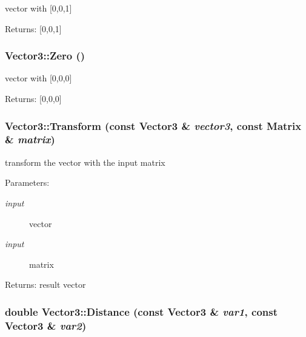 vector with \mbox{[}0,0,1\mbox{]} \begin{Desc}
\item[Returns:]\mbox{[}0,0,1\mbox{]} \end{Desc}
\hypertarget{class_vector3_596774f76ffa9334516e14065daa8902}{
\subsubsection[Zero]{ Vector3::Zero ()}}
\label{class_vector3_596774f76ffa9334516e14065daa8902}


vector with \mbox{[}0,0,0\mbox{]} \begin{Desc}
\item[Returns:]\mbox{[}0,0,0\mbox{]} \end{Desc}
\hypertarget{class_vector3_fd31dba5d2ea99d6da03b2fd220847f5}{
\subsubsection[Transform]{ Vector3::Transform (const {\bf Vector3} \& {\em vector3}, \/  const {\bf Matrix} \& {\em matrix})}}
\label{class_vector3_fd31dba5d2ea99d6da03b2fd220847f5}


transform the vector with the input matrix \begin{Desc}
\item[Parameters:]
\begin{description}
\item[{\em input}]vector \item[{\em input}]matrix \end{description}
\end{Desc}
\begin{Desc}
\item[Returns:]result vector \end{Desc}
\hypertarget{class_vector3_b1248a8c91f743e9eb2d849e76313587}{
\subsubsection[Distance]{\setlength{\rightskip}{0pt plus 5cm}double Vector3::Distance (const {\bf Vector3} \& {\em var1}, \/  const {\bf Vector3} \& {\em var2})}}
\label{class_vector3_b1248a8c91f743e9eb2d849e76313587}


